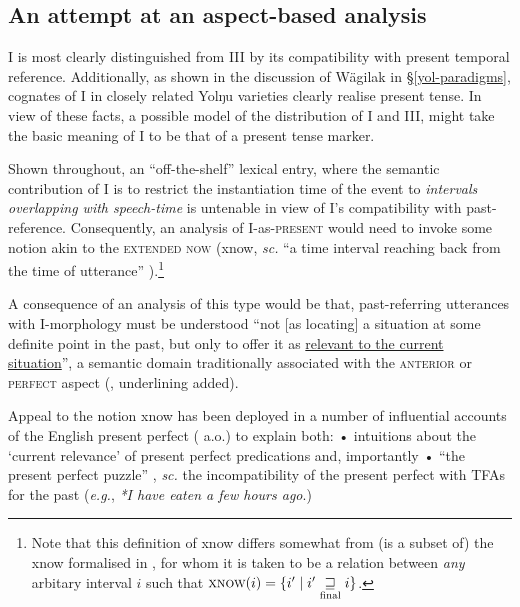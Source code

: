 
\subsection{An attempt at an aspect-based analysis}

\gls{I} is most clearly distinguished from \gls{III} by its compatibility with present temporal reference. Additionally, as shown in the discussion of Wägilak in \S\ref{yol-paradigms}, cognates of \gls{I} in closely related Yolŋu varieties clearly realise present tense. In view of these facts, a possible model of the distribution of \gls{I} and \gls{III}, might take the basic meaning of \gls{I} to be that of a present tense marker.

Shown throughout, an ``off-the-shelf'' lexical entry, where the semantic contribution of \gls{I} is to restrict the instantiation time of the event to\textit{ intervals overlapping with speech-time} is untenable in view of \gls{I}'s compatibility with past-reference. Consequently, an analysis of \gls{I}-as-\textsc{present} would need to invoke some notion akin to the \textsc{extended now} (\gls{xnow}, \textit{sc.} ``a time interval reaching back from the time of utterance'' \citealp[49]{Cover2010}).\footnote{Note that this definition of \gls{xnow} differs somewhat from (is a subset of) the \gls{xnow} formalised in \citealt[225]{Stump1985}, for whom it is taken to be a relation between \textsl{any} arbitary interval $ i $ such that $ \textsc{xnow}(i) = \{i'\mid i'\underset{\text{final}}{\sqsupseteq} i\}$.}

A consequence of an analysis of this type would be that, past-referring utterances with \gls{I}-morphology must be understood ``not [as locating] a situation at some definite point in the past, but only to offer it as \ul{relevant to the current situation}'', a semantic domain traditionally associated with the \textsc{anterior} or \textsc{perfect} aspect (\citealp[62]{Bybee1994}, underlining added).





Appeal to the notion \gls{xnow} has been deployed in a number of influential accounts of the English present perfect (\citealp[notably][]{McCoard1978, Portner2003} a.o.) to explain both: • intuitions about the `current relevance' of present perfect predications and, importantly • ``the present perfect puzzle'' \citep[see][]{Klein1992,Schaden2009}, \textit{sc.} the incompatibility of the present perfect with TFAs for the past (\textit{e.g.}, \textit{*I have eaten a few hours ago}.)

